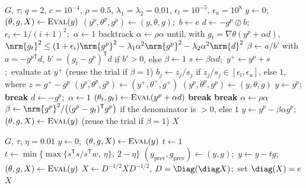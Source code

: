 \begin{algorithm}[p]
\caption{AGD-SDAJ~\cite{huynh2025accelerated} (AGD-SDAJ-BH: with the marked branch)}\label{alg:agd}
\begin{algorithmic}[1]
\Require $G$, $\tau$; $q=2$, $c=10^{-4}$, $\rho=0.5$, $\lambda_1=\lambda_2=0.01$, $\epsilon_l=10^{-5}$, $\epsilon_u=10^{8}$
\State $y\gets0$;\ $(\theta,g,X)\gets\textsc{Eval}(y)$
  \State $(y^{p},\theta^{p},g^{p})\gets(y,\theta,g)$;\ $b\gets e$ 
   
    \State $d\gets-g^p\oslash b$;\ $\epsilon_i\gets1/(i+1)^2$;\ $\alpha\gets1$
    \State backtrack $\alpha\gets\rho\alpha$ until, with $g_t=\nabla\theta(y^p+\alpha d)$,
    \Statex \hspace{2\algorithmicindent}$\nrm{g_t}^2\le(1+\epsilon_i)\nrm{g^p}^2-\lambda_1\alpha^2\nrm{g^p}^2-\lambda_2\alpha^2\nrm{d}^2$ 
    \State $\beta\gets a/b'$ with $a=-g^{p\mathsf T}d$, $b'=(g_t-g^p)^{\mathsf T}d$ if $b'>0$, else $\beta\gets1$ 
    \State $s\gets\beta\alpha d$;\ $y^+\gets y^p+s$;\ evaluate at $y^+$ (reuse the trial if $\beta=1$)
    \State $b_j\gets z_j/s_j$ if $z_j/s_j\in[\epsilon_l,\epsilon_u]$, else $1$, where $z=g^+-g^p$
    \State $(y^p,\theta^p,g^p)\gets(y^+,\theta^+,g^+)$
  \EndFor
   $(y^p,\theta^p,g^p)\gets(y,\theta,g)$ \EndIf
   $y\gets y^p$; \textbf{break} 
  \EndIf
  \State $d\gets-g^p$;\ $\alpha\gets1$
  \Loop {}
    \State $(\theta_t,g_t)\gets\textsc{Eval}(y^p+\alpha d)$
     \textbf{break} \EndIf
     \textbf{break} \EndIf
    \State $\alpha\gets\rho\alpha$
  \EndLoop
  \State $\beta\gets\nrm{g^p}^2/\bigl((g^p-g_t)^{\mathsf T}g^p\bigr)$ if the denominator is $>0$, else $1$
  \State $y\gets y^p-\beta\alpha g^p$;\ $(\theta,g,X)\gets\textsc{Eval}(y)$ (reuse the trial if $\beta=1$)
\EndWhile
\State \Return $X$
\end{algorithmic}
\end{algorithm}

\begin{algorithm}[t]
\caption{SBB-Dual (clamped spectral gradient on the dual)}\label{alg:sbb}
\begin{algorithmic}[1]
\Require $G$, $\tau$, $\eta=0.01$
\State $y\gets0$;\ $(\theta,g,X)\gets\textsc{Eval}(y)$
    \State $t\gets1$
  \Else
    \State $t\gets\min\{\max\{s^{\mathsf T}s/s^{\mathsf T}w,\ \eta\},\ 2-\eta\}$ 
  \EndIf
  \State $(y_{\mathrm{prev}},g_{\mathrm{prev}})\gets(y,g)$;\ $y\gets y-tg$;\ $(\theta,g,X)\gets\textsc{Eval}(y)$
\EndWhile
\State $X\gets D^{-1/2}XD^{-1/2}$, $D=\Diag(\diag X)$;\ set $\diag(X)=e$ 
\State \Return $X$
\end{algorithmic}
\end{algorithm}

